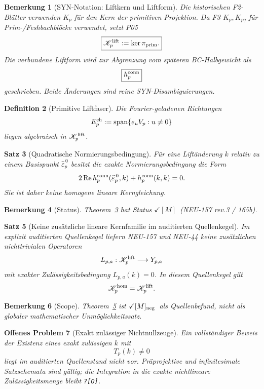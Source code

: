 \documentclass[11pt,a4paper]{amsart}
\newtheorem{theorem}{Satz}[section]
\newtheorem{definition}[theorem]{Definition}
\newtheorem{remark}[theorem]{Bemerkung}
\newtheorem{openproblem}[theorem]{Offenes Problem}
\newcommand{\stM}{\ensuremath{\checkmark[M]}}
\newcommand{\stMneg}{\ensuremath{\checkmark[M]_{\rm neg}}}
\newcommand{\Open}{\texttt{?[O]}}
\begin{document}
\begin{remark}[SYN-Notation: Liftkern und Liftform]
Die historischen F2-Blätter verwenden $K_p$ für den Kern der primitiven
Projektion. Da F3 $K_p,K_{pq}$ für Prim-/Feshbachblöcke verwendet, setzt P05
\[
\boxed{\mathscr K_p^{\rm lift}:=\ker\pi_{\rm prim}.}
\]
Die verbundene Liftform wird zur Abgrenzung vom späteren BC-Halbgewicht als
\[
\boxed{h_p^{\rm conn}}
\]
geschrieben. Beide Änderungen sind reine SYN-Disambiguierungen.
\end{remark}

\begin{definition}[Primitive Liftfaser]
Die Fourier-geladenen Richtungen
\[
E_p^{\rm ch}:=\operatorname{span}\{e_uV_p:u\neq0\}
\]
liegen algebraisch in $\mathscr K_p^{\rm lift}$.
\end{definition}

\begin{theorem}[Quadratische Normierungsbedingung]\label{thm:quadratic-lift}
Für eine Liftänderung $k$ relativ zu einem Basispunkt
$\widehat\varepsilon_p^{\,0}$ besitzt die exakte Normierungsbedingung die Form
\[
2\operatorname{Re}h_p^{\rm conn}(\widehat\varepsilon_p^{\,0},k)
+h_p^{\rm conn}(k,k)=0.
\]
Sie ist daher keine homogene lineare Kerngleichung.
\end{theorem}

\begin{remark}[Status]
Theorem~\ref{thm:quadratic-lift} hat Status \stM\ (NEU-157 rev.3 / 165b).
\end{remark}

\begin{theorem}[Keine zusätzliche lineare Kernfamilie im auditierten Quellenkegel]
\label{thm:no-extra-linear-kernel}
Im explizit auditierten Quellenkegel liefern NEU-157 und NEU-44 keine
zusätzlichen nichttrivialen Operatoren
\[
L_{p,a}:\mathscr K_p^{\rm lift}\longrightarrow Y_{p,a}
\]
mit exakter Zulässigkeitsbedingung $L_{p,a}(k)=0$. In diesem Quellenkegel gilt
\[
\mathscr K_p^{\rm hom}=\mathscr K_p^{\rm lift}.
\]
\end{theorem}

\begin{remark}[Scope]
Theorem~\ref{thm:no-extra-linear-kernel} ist \stMneg\ als Quellenbefund,
nicht als globaler mathematischer Unmöglichkeitssatz.
\end{remark}

\begin{openproblem}[Exakt zulässiger Nichtnullzeuge]
Ein vollständiger Beweis der Existenz eines exakt zulässigen $k$ mit
\[
T_p(k)\neq0
\]
liegt im auditierten Quellenstand nicht vor. Präprojektive und infinitesimale
Satzschemata sind gültig; die Integration in die exakte nichtlineare
Zulässigkeitsmenge bleibt \Open.
\end{openproblem}
\end{document}
